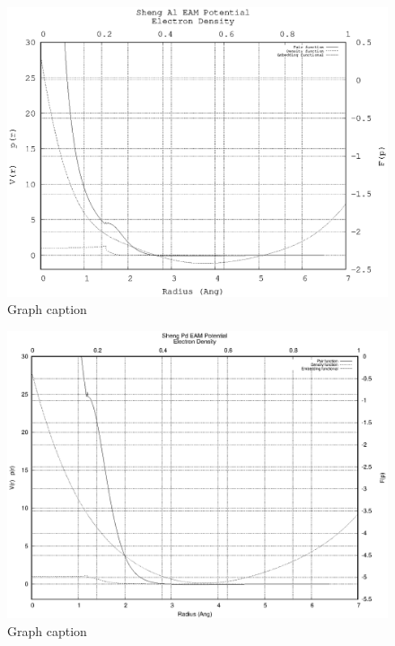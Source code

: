 \begin{figure}[tbp]
  \begin{center}
    \includegraphics{chapters/background_potential_fitting/plots/sheng_eam_al}%
    \caption{Graph caption}
    \label{graph:graph1}
  \end{center}
\end{figure}

\begin{figure}[tbp]
  \begin{center}
    \includegraphics{chapters/background_potential_fitting/plots/sheng_eam_pd}%
    \caption{Graph caption}
    \label{graph:graph1}
  \end{center}
\end{figure}



